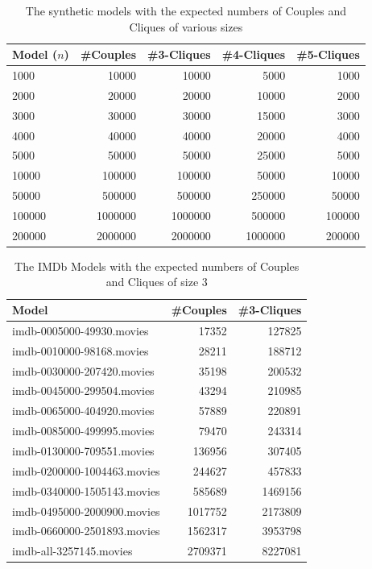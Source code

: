 \documentclass[a4paper,11pt]{article}
\begin{document}
\begin{table}[!ht]
  \centering
  \begin{tabular}{| l | r | r | r | r |}
    \hline
    \textbf{Model (\(n\))} & \textbf{\#Couples} & \textbf{\#3-Cliques} & \textbf{\#4-Cliques} & \textbf{\#5-Cliques}\\
    \hline
    1000   & 10000   & 10000   & 5000    & 1000\\
    2000   & 20000   & 20000   & 10000   & 2000\\
    3000   & 30000   & 30000   & 15000   & 3000\\
    4000   & 40000   & 40000   & 20000   & 4000\\
    5000   & 50000   & 50000   & 25000   & 5000\\
    10000  & 100000  & 100000  & 50000   & 10000\\
    50000  & 500000  & 500000  & 250000  & 50000\\
    100000 & 1000000 & 1000000 & 500000  & 100000\\
    200000 & 2000000 & 2000000 & 1000000 & 200000\\
    \hline
\end{tabular}
\caption{The synthetic models with the expected numbers of Couples and Cliques of various sizes}
\label{tab:synthetic-numbers}
\end{table}


\begin{table}[!ht]
  \centering
  \begin{tabular}{| l | r | r |}
    \hline
    \textbf{Model}              & \textbf{\#Couples} & \textbf{\#3-Cliques}\\
    \hline
    imdb-0005000-49930.movies   & 17352              & 127825\\
    imdb-0010000-98168.movies   & 28211              & 188712\\
    imdb-0030000-207420.movies  & 35198              & 200532\\
    imdb-0045000-299504.movies  & 43294              & 210985\\
    imdb-0065000-404920.movies  & 57889              & 220891\\
    imdb-0085000-499995.movies  & 79470              & 243314\\
    imdb-0130000-709551.movies  & 136956             & 307405\\
    imdb-0200000-1004463.movies & 244627             & 457833\\
    imdb-0340000-1505143.movies & 585689             & 1469156\\
    imdb-0495000-2000900.movies & 1017752            & 2173809\\
    imdb-0660000-2501893.movies & 1562317            & 3953798\\
    imdb-all-3257145.movies     & 2709371            & 8227081\\
    \hline
  \end{tabular}
  \caption{The IMDb Models with the expected numbers of Couples and Cliques of size 3}
  \label{tab:imdb-numbers}
\end{table}
\end{document}
